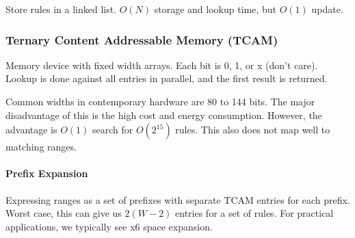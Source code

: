 \documentclass{idc_msc}
\begin{document}
Store rules in a linked list. \(O(N)\) storage and lookup time, but \(O(1)\) update.

\subsubsection{Ternary Content Addressable Memory (TCAM)}

Memory device with fixed width arrays.
Each bit is 0, 1, or x (don't care).
Lookup is done against all entries in parallel, and the first result is returned.

Common widths in contemporary hardware are 80 to 144 bits.
The major disadvantage of this is the high cost and energy consumption.
However, the advantage is \(O(1)\) search for \(O(2^{15})\) rules.
This also does not map well to matching ranges.

\paragraph{Prefix Expansion}

Expressing ranges as a set of prefixes with separate TCAM entries for each prefix.
Worst case, this can give us \(2(W-2)\) entries for a set of rules.
For practical applications, we typically see x6 space expansion.
\end{document}
